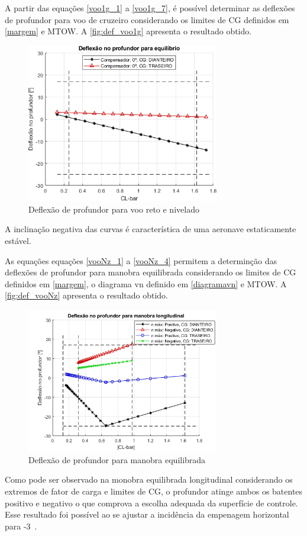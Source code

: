 A partir das equações \ref{voo1g_1} a \ref{voo1g_7}, é possível determinar as deflexões de profundor para voo de cruzeiro considerando os limites de CG definidos em \autoref{margem} e MTOW. A \autoref{fig:def_voo1g} apresenta o resultado obtido.

\begin{figure}[H]
\centering
\includegraphics[width=0.75\textwidth]{images/parte3/De_equi_c20.png}
\caption[Deflexão de profundor para voo reto e nivelado]{Deflexão de profundor para voo reto e nivelado}
\label{fig:def_voo1g}
\end{figure}

A inclinação negativa das curvas é característica de uma aeronave estaticamente estável.

As equações equações \ref{vooNz_1} a \ref{vooNz_4} permitem a determinção das deflexões de profundor para manobra equilibrada considerando os limites de CG definidos em \autoref{margem}, o diagrama vn definido em \autoref{diagramavn} e MTOW. A \autoref{fig:def_vooNz} apresenta o resultado obtido.

\begin{figure}[H]
\centering
\includegraphics[width=0.75\textwidth]{images/parte3/De_man_c20.png}
\caption[Deflexão de profundor para manobra equilibrada]{Deflexão de profundor para manobra equilibrada}
\label{fig:def_vooNz}
\end{figure}

Como pode ser observado na monobra equilibrada longitudinal considerando os extremos de fator de carga e limites de CG, o profundor atinge ambos os batentes positivo e negativo o que comprova a escolha adequada da superfície de controle. Esse resultado foi possível ao se ajustar a incidência da empenagem horizontal para -3\textdegree\ .
